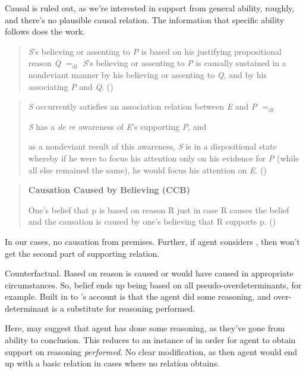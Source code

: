 \begin{note}[Causal]
  Causal is ruled out, as we're interested in support from general ability, roughly, and there's no plausible causal relation.
  The information that specific ability follows does the work.

  \cite{Moser:1989tv}
  \begin{quote}
    \emph{S}'s believing or assenting to \emph{P} is based on his justifying propositional reason \emph{Q} \(=_{\text{df}}\) \emph{S}'s believing or assenting to \emph{P} is causally sustained in a nondeviant manner by his believing or assenting to \emph{Q}, and by his associating \emph{P} and \emph{Q}.\nolinebreak
    \mbox{}\hfill\mbox{(\citeyear[157]{Moser:1989tv})}
  \end{quote}

  \begin{quote}
    \emph{S} occurrently satisfies an association relation between \emph{E} and \emph{P} \(=_{\text{df}}\)
    \begin{enumerate*}[label=(\roman*)]
    \item \emph{S} has a \emph{de re} awareness of \emph{E}'s supporting \emph{P}, and
    \item as a nondeviant result of this awareness, \emph{S} is in a dispositional state whereby if he were to focus his attention only on his evidence for \emph{P} (while all else remained the same), he would focus his attention on \emph{E}.
      \newline
      \mbox{}\hfill\mbox{(\citeyear[141--142]{Moser:1989tv})}
    \end{enumerate*}
  \end{quote}

  \cite{Ye:2019ux}
  \begin{quote}
    \textbf{Causation Caused by Believing (CCB)}

    One's belief that p is based on reason R just in case R causes the belief and the causation is caused by one's believing that R supports p.
    \newline
    \mbox{}\hfill\mbox{(\citeyear[27]{Ye:2019ux})}
  \end{quote}
  In our cases, no causation from premises.
  Further, if agent considers \nI{}, then won't get the second part of supporting relation.
\end{note}

\begin{note}[Counterfactual]
  Counterfactual.
  Based on reason is caused or would have caused in appropriate circumstances.
  So, belief ends up being based on all pseudo-overdeterminants, for example.
  Built in to \citeauthor{Swain:1981wd}'s account is that the agent did some reasoning, and over-determinant is a substitute for reasoning performed.

  Here, may suggest that agent has done some reasoning, as they've gone from ability to conclusion.
  This reduces to an instance of \AR{} in order for agent to obtain support on reasoning \emph{performed}.
  No clear modification, as then agent would end up with a basic relation in cases where no relation obtains.
\end{note}

